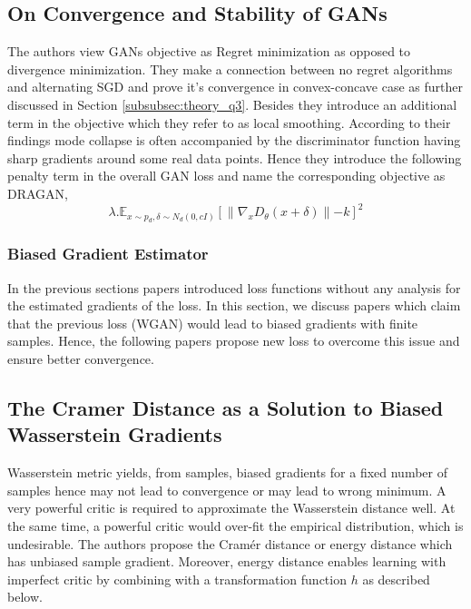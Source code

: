 \subsection*{On Convergence and Stability of GANs \citep{DRAGAN}}
The authors  view GANs objective as Regret minimization as opposed to divergence minimization. They make a connection between no regret algorithms and alternating SGD and prove it's convergence in convex-concave case as further discussed in Section \ref{subsubsec:theory_q3}. Besides they introduce an additional term in the objective which they refer to as local smoothing. According to their findings mode collapse is often accompanied by the discriminator function having sharp gradients around some real data points. Hence they introduce the following penalty term in the overall GAN loss and name the corresponding objective as DRAGAN, $$\lambda. \mathbb{E}_{x \sim p_{d}, \delta\sim N_{d}(0, cI)} [\parallel \nabla_{x}D_{\theta}(x + \delta) \parallel - k]^2 $$
\subsubsection{Biased Gradient Estimator} 
\label{subsubsec:loss_bge} In the previous sections papers introduced loss functions without any analysis for the estimated gradients of the loss. In this section, we discuss papers which claim that the previous loss (WGAN) would lead to biased gradients with finite samples. Hence, the following papers propose new loss to overcome this issue and ensure better convergence.
\subsection*{The Cramer Distance as a Solution to Biased Wasserstein Gradients \citep{cramer}} Wasserstein metric yields, from samples,  biased gradients for a fixed number of samples hence may not lead to convergence or may lead to wrong minimum. A very powerful critic is required to approximate the Wasserstein distance well. At the same time, a powerful critic would over-fit the empirical distribution, which is undesirable. The authors propose the Cramér distance or energy distance which has unbiased sample gradient. Moreover, energy distance enables learning with imperfect critic by combining with a transformation function $h$ as described below.

